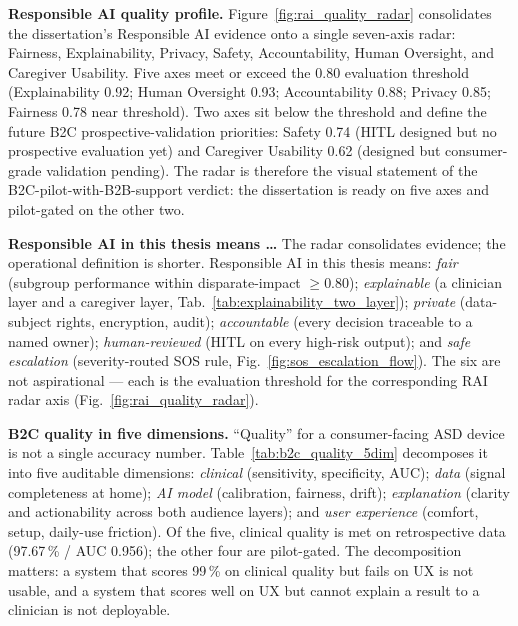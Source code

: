 

\noindent\textbf{Responsible AI quality profile.} Figure~\ref{fig:rai_quality_radar} consolidates the dissertation's Responsible AI evidence onto a single seven-axis radar: Fairness, Explainability, Privacy, Safety, Accountability, Human Oversight, and Caregiver Usability. Five axes meet or exceed the 0.80 evaluation threshold (Explainability 0.92; Human Oversight 0.93; Accountability 0.88; Privacy 0.85; Fairness 0.78 near threshold). Two axes sit below the threshold and define the future B2C prospective-validation priorities: Safety 0.74 (HITL designed but no prospective evaluation yet) and Caregiver Usability 0.62 (designed but consumer-grade validation pending). The radar is therefore the visual statement of the B2C-pilot-with-B2B-support verdict: the dissertation is ready on five axes and pilot-gated on the other two.



\noindent\textbf{Responsible AI in this thesis means \ldots} The radar consolidates evidence; the operational definition is shorter. Responsible AI in this thesis means: \emph{fair} (subgroup performance within disparate-impact $\geq 0.80$); \emph{explainable} (a clinician layer and a caregiver layer, Tab.~\ref{tab:explainability_two_layer}); \emph{private} (data-subject rights, encryption, audit); \emph{accountable} (every decision traceable to a named owner); \emph{human-reviewed} (HITL on every high-risk output); and \emph{safe escalation} (severity-routed SOS rule, Fig.~\ref{fig:sos_escalation_flow}). The six are not aspirational --- each is the evaluation threshold for the corresponding RAI radar axis (Fig.~\ref{fig:rai_quality_radar}).

\noindent\textbf{B2C quality in five dimensions.} ``Quality'' for a consumer-facing ASD device is not a single accuracy number. Table~\ref{tab:b2c_quality_5dim} decomposes it into five auditable dimensions: \emph{clinical} (sensitivity, specificity, AUC); \emph{data} (signal completeness at home); \emph{AI model} (calibration, fairness, drift); \emph{explanation} (clarity and actionability across both audience layers); and \emph{user experience} (comfort, setup, daily-use friction). Of the five, clinical quality is met on retrospective data (97.67\,\% / AUC 0.956); the other four are pilot-gated. The decomposition matters: a system that scores 99\,\% on clinical quality but fails on UX is not usable, and a system that scores well on UX but cannot explain a result to a clinician is not deployable.

